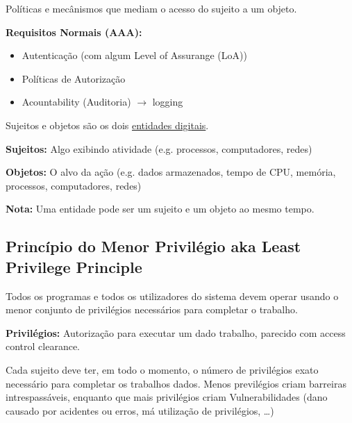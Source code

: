 \documentclass{article}
\begin{document}
Políticas e mecânismos que mediam o acesso do sujeito a um objeto.

\vspace{2mm}

\begin{flushleft}
  \textbf{Requisitos Normais (AAA):}
  \begin{itemize}
    \item Autenticação (com algum Level of Assurange (LoA))
    \item Políticas de Autorização
    \item Acountability (Auditoria) $\rightarrow$ logging
  \end{itemize}
\end{flushleft}

Sujeitos e objetos são os dois \uline{entidades digitais}.

\begin{flushleft}
  \textbf{Sujeitos:} Algo exibindo atividade (e.g. processos, computadores, redes)

  \vspace{2mm}

  \textbf{Objetos:} O alvo da ação (e.g. dados armazenados, tempo de CPU,
  memória, processos, computadores, redes)

  \vspace{2mm}

  \textbf{Nota:} Uma entidade pode ser um sujeito e um objeto ao mesmo tempo.
\end{flushleft}

\subsection{Princípio do Menor Privilégio aka Least Privilege Principle}

Todos os programas e todos os utilizadores do sistema devem operar usando
o menor conjunto de privilégios necessários para completar o trabalho.

\vspace{2mm}

\begin{flushleft}
  \textbf{Privilégios:} Autorização para executar um dado trabalho, parecido
  com access control clearance.
\end{flushleft}

Cada sujeito deve ter, em todo o momento, o número de privilégios exato necessário
para completar os trabalhos dados. Menos previlégios criam
barreiras intrespassáveis, enquanto que mais privilégios criam Vulnerabilidades
(dano causado por acidentes ou erros, má utilização de privilégios, \dots)
\end{document}

